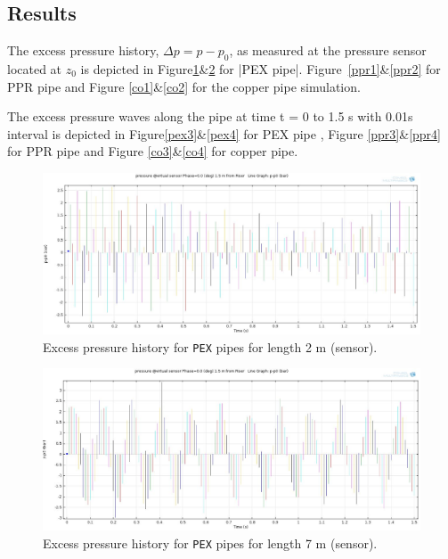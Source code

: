 \subsection{Results}

The excess pressure history, $\Delta p=p-p_0$, as measured at the pressure sensor located at $z_0$
is depicted in Figure\ref{pex1}\&\ref{pex2} for |PEX pipe|. Figure~\ref{ppr1}\&\ref{ppr2} for PPR pipe and Figure \ref{co1}\&\ref{co2} for the copper pipe simulation.

The excess pressure waves along the pipe at time t = 0 to 1.5 s with 0.01s interval is
depicted in Figure\ref{pex3}\&\ref{pex4} for PEX pipe , Figure \ref{ppr3}\&\ref{ppr4} for PPR pipe and Figure \ref{co3}\&\ref{co4} for copper pipe.


\begin{figure}[htbp]
\hspace*{-0.1\textwidth}\includegraphics[width=1.2\textwidth]{./water-hammer/PEX/PEX-2-sensor}
\caption{Excess pressure history for \texttt{PEX} pipes for length 2 m (sensor).}
\label{pex1}
\end{figure}

\begin{figure}[htbp]
\hspace*{-0.1\textwidth}\includegraphics[width=1.2\textwidth]{./water-hammer/PEX/PEX-7-sensor}
\caption{Excess pressure history for \texttt{PEX} pipes for length 7 m (sensor).}
\label{pex2}
\end{figure}

